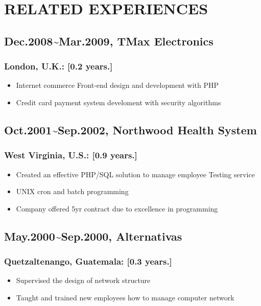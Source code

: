 \documentclass[12pt,a4paper]{article}
\begin{document}
\section{RELATED EXPERIENCES}
\subsection{Dec.2008{\textasciitilde}Mar.2009, TMax Electronics}
\subsubsection{London, U.K.: [0.2 years.]}
\begin{itemize}
\item Internet commerce Front-end design and development with PHP


\item Credit card payment system develoment with security algorithms

\end{itemize}
\subsection{Oct.2001{\textasciitilde}Sep.2002, Northwood Health System}
\subsubsection{West Virginia, U.S.: [0.9 years.]}
\begin{itemize}
\item Created an effective PHP/SQL solution to manage employee Testing service


\item UNIX cron and batch programming


\item Company offered 5yr contract due to excellence in programming

\end{itemize}
\subsection{May.2000{\textasciitilde}Sep.2000, Alternativas}
\subsubsection{Quetzaltenango, Guatemala: [0.3 years.]}
\begin{itemize}
\item Supervised the design of network structure


\item Taught and trained new employees how to manage computer network

\end{itemize}
\end{document}
